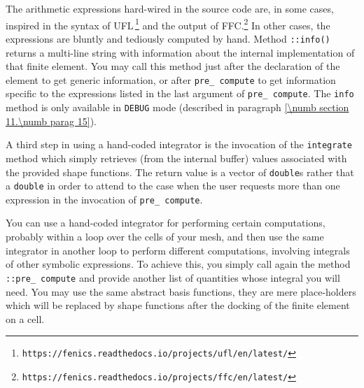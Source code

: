 The arithmetic expressions hard-wired in the source code are, in some cases, inspired
in the syntax of UFL$\,$\footnote {{} \small\tt https://fenics.readthedocs.io/projects/ufl/en/latest/}
and the output of FFC.\footnote {{} \small\tt https://fenics.readthedocs.io/projects/ffc/en/latest/}
In other cases, the expressions are bluntly and tediously computed by hand.
Method {\small\tt{}::info()} returns a multi-line string with information
about the internal implementation of that finite element.
You may call this method just after the declaration of the element to get generic information,
or after {\small\tt pre\_\,compute} to get information specific to the expressions
listed in the last argument of {\small\tt pre\_\,compute}.
The {\small\tt info} method is only available in {\small\tt DEBUG} mode (described in paragraph
\ref{\numb section 11.\numb parag 15}).

A third step in using a hand-coded integrator is the invocation of the
{\small\tt integrate} method which simply retrieves (from the internal buffer) values 
associated with the provided shape functions.
The return value is a vector of {\small\tt double}s rather that a {\small\tt double}
in order to attend to the case when the user requests more than one expression
in the invocation of {\small\tt pre\_\,compute}.

You can use a hand-coded integrator for performing certain computations,
probably within a loop over the cells of your mesh, and then use the same integrator in another loop
to perform different computations, involving integrals of other symbolic expressions.
To achieve this, you simply call again the method {\small\tt{}::pre\_\,compute}
and provide another list of quantities whose integral you will need.
You may use the same abstract basis functions, they are mere place-holders which will be replaced
by shape functions after the docking of the finite element on a cell.
